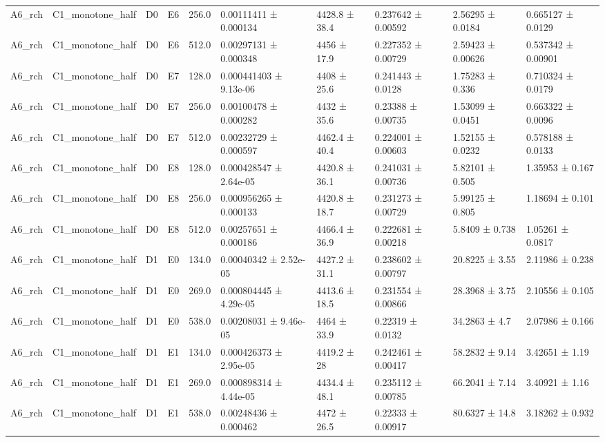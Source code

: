 \begin{table}
\begin{tabular}{llllllllll}
A6\_rch & C1\_monotone\_half & D0 & E6 & 256.0 & 0.00111411 ± 0.000134 & 4428.8 ± 38.4 & 0.237642 ± 0.00592 & 2.56295 ± 0.0184 & 0.665127 ± 0.0129 \\
A6\_rch & C1\_monotone\_half & D0 & E6 & 512.0 & 0.00297131 ± 0.000348 & 4456 ± 17.9 & 0.227352 ± 0.00729 & 2.59423 ± 0.00626 & 0.537342 ± 0.00901 \\
A6\_rch & C1\_monotone\_half & D0 & E7 & 128.0 & 0.000441403 ± 9.13e-06 & 4408 ± 25.6 & 0.241443 ± 0.0128 & 1.75283 ± 0.336 & 0.710324 ± 0.0179 \\
A6\_rch & C1\_monotone\_half & D0 & E7 & 256.0 & 0.00100478 ± 0.000282 & 4432 ± 35.6 & 0.23388 ± 0.00735 & 1.53099 ± 0.0451 & 0.663322 ± 0.0096 \\
A6\_rch & C1\_monotone\_half & D0 & E7 & 512.0 & 0.00232729 ± 0.000597 & 4462.4 ± 40.4 & 0.224001 ± 0.00603 & 1.52155 ± 0.0232 & 0.578188 ± 0.0133 \\
A6\_rch & C1\_monotone\_half & D0 & E8 & 128.0 & 0.000428547 ± 2.64e-05 & 4420.8 ± 36.1 & 0.241031 ± 0.00736 & 5.82101 ± 0.505 & 1.35953 ± 0.167 \\
A6\_rch & C1\_monotone\_half & D0 & E8 & 256.0 & 0.000956265 ± 0.000133 & 4420.8 ± 18.7 & 0.231273 ± 0.00729 & 5.99125 ± 0.805 & 1.18694 ± 0.101 \\
A6\_rch & C1\_monotone\_half & D0 & E8 & 512.0 & 0.00257651 ± 0.000186 & 4466.4 ± 36.9 & 0.222681 ± 0.00218 & 5.8409 ± 0.738 & 1.05261 ± 0.0817 \\
A6\_rch & C1\_monotone\_half & D1 & E0 & 134.0 & 0.00040342 ± 2.52e-05 & 4427.2 ± 31.1 & 0.238602 ± 0.00797 & 20.8225 ± 3.55 & 2.11986 ± 0.238 \\
A6\_rch & C1\_monotone\_half & D1 & E0 & 269.0 & 0.000804445 ± 4.29e-05 & 4413.6 ± 18.5 & 0.231554 ± 0.00866 & 28.3968 ± 3.75 & 2.10556 ± 0.105 \\
A6\_rch & C1\_monotone\_half & D1 & E0 & 538.0 & 0.00208031 ± 9.46e-05 & 4464 ± 33.9 & 0.22319 ± 0.0132 & 34.2863 ± 4.7 & 2.07986 ± 0.166 \\
A6\_rch & C1\_monotone\_half & D1 & E1 & 134.0 & 0.000426373 ± 2.95e-05 & 4419.2 ± 28 & 0.242461 ± 0.00417 & 58.2832 ± 9.14 & 3.42651 ± 1.19 \\
A6\_rch & C1\_monotone\_half & D1 & E1 & 269.0 & 0.000898314 ± 4.44e-05 & 4434.4 ± 48.1 & 0.235112 ± 0.00785 & 66.2041 ± 7.14 & 3.40921 ± 1.16 \\
A6\_rch & C1\_monotone\_half & D1 & E1 & 538.0 & 0.00248436 ± 0.000462 & 4472 ± 26.5 & 0.22333 ± 0.00917 & 80.6327 ± 14.8 & 3.18262 ± 0.932 \\

\end{tabular}
\end{table}
